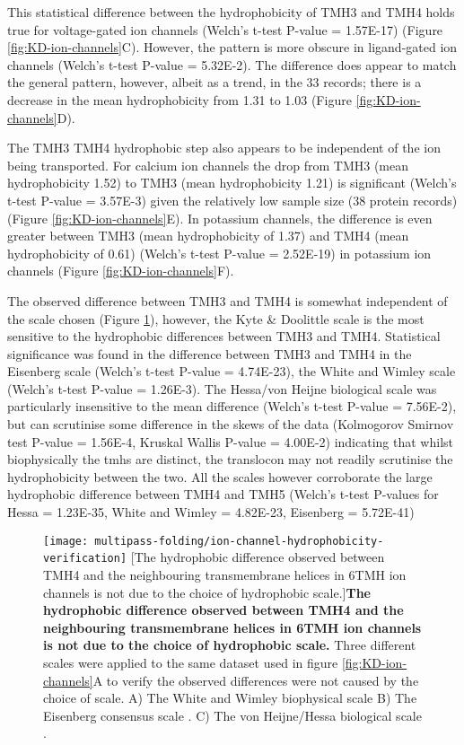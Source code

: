 This statistical difference between the hydrophobicity of TMH3 and TMH4 holds true for voltage\--gated ion channels (Welch's t\--test P\--value = 1.57E-17) (Figure \ref{fig:KD-ion-channels}C).
However, the pattern is more obscure in ligand\--gated ion channels (Welch's t\--test P\--value = 5.32E-2).
The difference does appear to match the general pattern, however, albeit as a trend, in the 33 records; there is a decrease in the mean hydrophobicity from 1.31 to 1.03 (Figure \ref{fig:KD-ion-channels}D).

 The TMH3 TMH4 hydrophobic step also appears to be independent of the ion being transported.
 For calcium ion channels the drop from TMH3 (mean hydrophobicity 1.52) to TMH3 (mean hydrophobicity 1.21) is significant (Welch's t\--test P\--value = 3.57E-3) given the relatively low sample size (38 protein records) (Figure \ref{fig:KD-ion-channels}E).
In potassium channels, the difference is even greater between TMH3 (mean hydrophobicity of 1.37) and TMH4 (mean hydrophobicity of 0.61) (Welch's t\--test P\--value = 2.52E-19) in potassium ion channels (Figure \ref{fig:KD-ion-channels}F).

The observed difference between TMH3 and TMH4 is somewhat independent of the scale chosen (Figure \ref{fig:ion-channel-hydrophobicity-verification}), however, the Kyte \& Doolittle scale is the most sensitive to the hydrophobic differences between TMH3 and TMH4.
Statistical significance was found in the difference between TMH3 and TMH4 in the Eisenberg scale (Welch's t\--test P\--value = 4.74E-23), the White and Wimley scale (Welch's t\--test P\--value = 1.26E-3).
The Hessa/von Heijne biological scale was particularly insensitive to the mean difference (Welch's t\--test P\--value = 7.56E-2), but can scrutinise some difference in the skews of the data (Kolmogorov Smirnov test  P\--value = 1.56E-4, Kruskal Wallis P\--value = 4.00E-2) indicating that whilst biophysically the \gls{tmh}s are distinct, the translocon may not readily scrutinise the hydrophobicity between the two.
All the scales however corroborate the large hydrophobic difference between TMH4 and TMH5 (Welch's t\--test P\--values for Hessa = 1.23E-35, White and Wimley = 4.82E-23, Eisenberg = 5.72E-41)

\begin{figure}[!ht]
\centering
\texttt{[image: multipass-folding/ion-channel-hydrophobicity-verification]}
  [The hydrophobic difference observed between TMH4 and the neighbouring transmembrane helices in 6TMH ion channels is not due to the choice of hydrophobic scale.]{\textbf{The hydrophobic difference observed between TMH4 and the neighbouring transmembrane helices in 6TMH ion channels is not due to the choice of hydrophobic scale.}
  Three different scales were applied to the same dataset used in figure \ref{fig:KD-ion-channels}A to verify the observed differences were not caused by the choice of scale.
  A) The White and Wimley biophysical scale \cite{White1999}
  B) The Eisenberg consensus scale \cite{Eisenberg1984}.
  C) The von Heijne/Hessa biological scale \cite{Hessa2005}.}

\label{fig:ion-channel-hydrophobicity-verification}
\end{figure}

